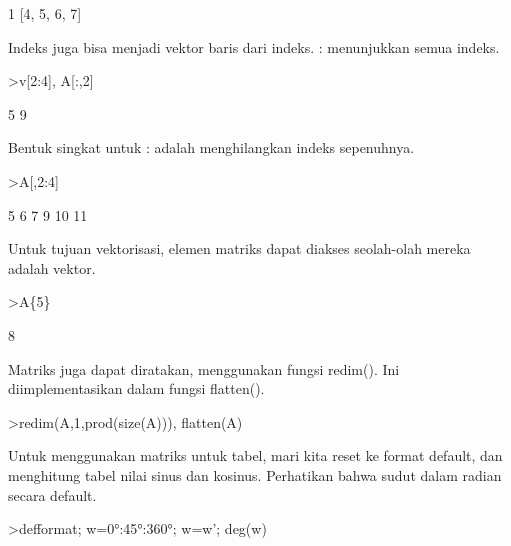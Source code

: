 \documentclass[a4paper,10pt]{article}
\begin{document}
\begin{eulernotebook}
\begin{eulercomment}
\begin{eulercomment}
\begin{eulercomment}
\begin{eulercomment}
\begin{euleroutput}
  1
  [4,  5,  6,  7]
\end{euleroutput}
\begin{eulercomment}
Indeks juga bisa menjadi vektor baris dari indeks. : menunjukkan semua
indeks.
\end{eulercomment}
\begin{eulerprompt}
>v[2:4], A[:,2]
\end{eulerprompt}
\begin{euleroutput}
  [3,  5,  7]
              5 
              9 
\end{euleroutput}
\begin{eulercomment}
Bentuk singkat untuk : adalah menghilangkan indeks sepenuhnya.
\end{eulercomment}
\begin{eulerprompt}
>A[,2:4]
\end{eulerprompt}
\begin{euleroutput}
              5             6             7 
              9            10            11 
\end{euleroutput}
\begin{eulercomment}
Untuk tujuan vektorisasi, elemen matriks dapat diakses seolah-olah
mereka adalah vektor.
\end{eulercomment}
\begin{eulerprompt}
>A\{5\}
\end{eulerprompt}
\begin{euleroutput}
  8
\end{euleroutput}
\begin{eulercomment}
Matriks juga dapat diratakan, menggunakan fungsi redim(). Ini
diimplementasikan dalam fungsi flatten().
\end{eulercomment}
\begin{eulerprompt}
>redim(A,1,prod(size(A))), flatten(A)
\end{eulerprompt}
\begin{euleroutput}
  [4,  5,  6,  7,  8,  9,  10,  11]
  [4,  5,  6,  7,  8,  9,  10,  11]
\end{euleroutput}
\begin{eulercomment}
Untuk menggunakan matriks untuk tabel, mari kita reset ke format
default, dan menghitung tabel nilai sinus dan kosinus. Perhatikan
bahwa sudut dalam radian secara default.
\end{eulercomment}
\begin{eulerprompt}
>defformat; w=0°:45°:360°; w=w'; deg(w)
\end{eulerprompt}
\begin{euleroutput}

\end{euleroutput}
\end{eulercomment}
\end{eulercomment}
\end{eulercomment}
\end{eulercomment}
\end{eulernotebook}
\end{document}
